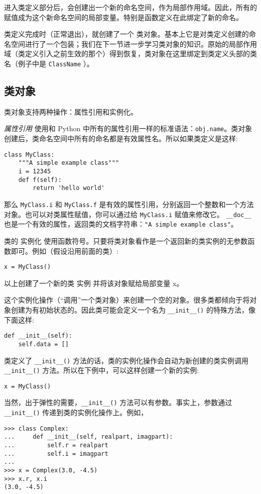 进入类定义部分后，会创建出一个新的命名空间，作为局部作用域。因此，所有的赋值成为这个新命名空间的局部变量。特别是函数定义在此绑定了新的命名。

类定义完成时（正常退出），就创建了一个 类对象。基本上它是对类定义创建的命名空间进行了一个包装；我们在下一节进一步学习类对象的知识。原始的局部作用域（类定义引入之前生效的那个）得到恢复，类对象在这里绑定到类定义头部的类名（例子中是 \texttt{ClassName} ）。
\subsection{类对象}
类对象支持两种操作：属性引用和实例化。

\textit{属性引用} 使用和 Python 中所有的属性引用一样的标准语法：\texttt{obj.name}。类对象创建后，类命名空间中所有的命名都是有效属性名。所以如果类定义是这样:
\begin{lstlisting}
class MyClass:
    """A simple example class"""
    i = 12345
    def f(self):
        return 'hello world'
\end{lstlisting}
那么 \texttt{MyClass.i} 和 \texttt{MyClass.f} 是有效的属性引用，分别返回一个整数和一个方法对象。也可以对类属性赋值，你可以通过给 \texttt{MyClass.i} 赋值来修改它。 \verb|__doc__| 也是一个有效的属性，返回类的文档字符串：\texttt{"A simple example class"}。

类的 实例化 使用函数符号。只要将类对象看作是一个返回新的类实例的无参数函数即可。例如（假设沿用前面的类）:
\begin{lstlisting}
x = MyClass()
\end{lstlisting}
以上创建了一个新的类 实例 并将该对象赋给局部变量 x。

这个实例化操作（“调用”一个类对象）来创建一个空的对象。很多类都倾向于将对象创建为有初始状态的。因此类可能会定义一个名为 \verb|__init__()| 的特殊方法，像下面这样:
\begin{lstlisting}
def __init__(self):
    self.data = []
\end{lstlisting}
类定义了 \verb|__init__()| 方法的话，类的实例化操作会自动为新创建的类实例调用 \verb|__init__()| 方法。所以在下例中，可以这样创建一个新的实例:
\begin{lstlisting}
x = MyClass()
\end{lstlisting}
当然，出于弹性的需要，\verb|__init__()| 方法可以有参数。事实上，参数通过 \verb|__init__()| 传递到类的实例化操作上。例如，
\begin{lstlisting}
>>> class Complex:
...     def __init__(self, realpart, imagpart):
...         self.r = realpart
...         self.i = imagpart
...
>>> x = Complex(3.0, -4.5)
>>> x.r, x.i
(3.0, -4.5)
\end{lstlisting}
